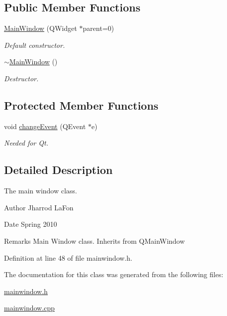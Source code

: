 \subsection*{Public Member Functions}
\begin{DoxyCompactItemize}
\item 
\hypertarget{classMainWindow_a8b244be8b7b7db1b08de2a2acb9409db}{
\hyperlink{classMainWindow_a8b244be8b7b7db1b08de2a2acb9409db}{MainWindow} (QWidget $\ast$parent=0)}
\label{classMainWindow_a8b244be8b7b7db1b08de2a2acb9409db}

\begin{DoxyCompactList}\small\item\em Default constructor. \item\end{DoxyCompactList}\item 
\hypertarget{classMainWindow_ae98d00a93bc118200eeef9f9bba1dba7}{
\hyperlink{classMainWindow_ae98d00a93bc118200eeef9f9bba1dba7}{$\sim$MainWindow} ()}
\label{classMainWindow_ae98d00a93bc118200eeef9f9bba1dba7}

\begin{DoxyCompactList}\small\item\em Destructor. \item\end{DoxyCompactList}\end{DoxyCompactItemize}
\subsection*{Protected Member Functions}
\begin{DoxyCompactItemize}
\item 
\hypertarget{classMainWindow_af4ca5d0d3d18ddcb7d54b6596bbf4797}{
void \hyperlink{classMainWindow_af4ca5d0d3d18ddcb7d54b6596bbf4797}{changeEvent} (QEvent $\ast$e)}
\label{classMainWindow_af4ca5d0d3d18ddcb7d54b6596bbf4797}

\begin{DoxyCompactList}\small\item\em Needed for Qt. \item\end{DoxyCompactList}\end{DoxyCompactItemize}


\subsection{Detailed Description}
The main window class. \begin{DoxyAuthor}{Author}
Jharrod LaFon 
\end{DoxyAuthor}
\begin{DoxyDate}{Date}
Spring 2010 
\end{DoxyDate}
\begin{DoxyRemark}{Remarks}
Main Window class. Inherits from QMainWindow 
\end{DoxyRemark}


Definition at line 48 of file mainwindow.h.



The documentation for this class was generated from the following files:\begin{DoxyCompactItemize}
\item 
\hyperlink{mainwindow_8h}{mainwindow.h}\item 
\hyperlink{mainwindow_8cpp}{mainwindow.cpp}\end{DoxyCompactItemize}
